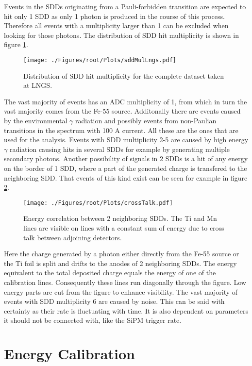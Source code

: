 Events in the SDDs originating from a Pauli-forbidden transition are expected to hit only 1 SDD as only 1 photon is produced in the course of this process. Therefore all events with a multiplicity larger than 1 can be excluded when looking for those photons. The distribution of SDD hit multiplicity is shown in figure \ref{fig:sddMulLngs}.
\begin{figure}[h]
 \centering
 \texttt{[image: ./Figures/root/Plots/sddMulLngs.pdf]}
 \caption{Distribution of SDD hit multiplicity for the complete dataset taken at LNGS.}
 \label{fig:sddMulLngs}
\end{figure}
The vast majority of events has an ADC multiplicity of 1, from which in turn the vast majority comes from the Fe-55 source. Additonally there are events caused by the environmental $\gamma$ radiation and possibly events from non-Paulian transitions in the spectrum with 100 A current. All these are the ones that are used for the analysis. Events with SDD multiplicity 2-5 are caused by high energy $\gamma$ radiation causing hits in several SDDs for example by generating multiple secondary photons. Another possibility of signals in 2 SDDs is a hit of any energy on the border of 1 SDD, where a part of the generated charge is transfered to the neighboring SDD. That events of this kind exist can be seen for example in figure \ref{fig:crossTalk}.
\begin{figure}[h]
 \centering
 \texttt{[image: ./Figures/root/Plots/crossTalk.pdf]}
 \caption{Energy correlation between 2 neighboring SDDs. The Ti and Mn lines are visible on lines with a constant sum of energy due to cross talk between adjoining detectors.}
 \label{fig:crossTalk}
\end{figure}
Here the charge generated by a photon either directly from the Fe-55 source or the Ti foil is split and drifts to the anodes of 2 neighboring SDDs. The energy equivalent to the total deposited charge equals the energy of one of the calibration lines. Consequently these lines run diagonally through the figure. Low energy parts are cut from the figure to enhance visibility. The vast majority of events with SDD multiplicity 6 are caused by noise. This can be said with certainty as their rate is fluctuating with time. It is also dependent on parameters it should not be connected with, like the SiPM trigger rate.

\section{Energy Calibration}
\label{sec:eneCal}

